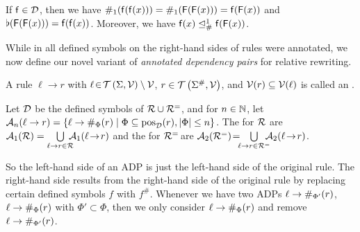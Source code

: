 \begin{example}
    If $\mathsf{f} \in \mathcal{D}$, then we have $\#_{1}(\mathsf{f}(\mathsf{f}(x))) =
    \#_{1}(\mathsf{F}(\mathsf{F}(x))) = \mathsf{f}(\mathsf{F}(x))$ and $\flat(\mathsf{F}(\mathsf{F}(x))) = \mathsf{f}(\mathsf{f}(x))$. 
    Moreover, we have $\mathsf{f}(x) \trianglelefteq_{\#}^{1} \mathsf{f}(\mathsf{F}(x))$.
\end{example}


While in \cite{FLOPS2024} all defined symbols on the right-hand sides of rules were
annotated, 
we now define our novel variant of \emph{annotated dependency pairs}
for relative rewriting.

\begin{definition}\label{def:Canonical-ADPs}
\hspace*{-.2cm}    A rule $\ell\!\to\!r$ with $\ell\!\in\!\TSet{\Sigma}{\VSet} \setminus\linebreak
    \VSet$, $r \in \mathcal{T}\left(\Sigma^\#,\mathcal{V}\right)$, and $\mathcal{V}(r) \subseteq \mathcal{V}(\ell)$ is
    called an
    .
 
    Let $\mathcal{D}$ be the defined symbols of $\mathcal{R} \cup \mathcal{R}^=$, and for $n \in
    \mathbb{N}$, let $\ADPair{n}{\ell \to r}  =  
    \{\ell \to\linebreak \anno_{\Phi}(r) \mid \Phi \subseteq \pos_{\SignatureD}(r), |\Phi| \leq n\}$.
\pagebreak[2]  The   for $\mathcal{R}$ are $\mathcal{A}_{1}(\mathcal{R}) = \bigcup\limits_{\ell \to r \in \mathcal{R}}
  \!\!\!\!  \mathcal{A}_{1}(\ell\!\to\!r)$ and  the  for $\mathcal{R}^=\!$
are  $\ADPairBase{\R^{=}}\!= \!\!\!
    \bigcup\limits_{\ell \to r \in \R^=} \!\!\!\! \ADPairBase{\ell\!\to\!r}$.
\end{definition}

So the left-hand side of an ADP is just the left-hand side of the original rule.
The right-hand side  results from the right-hand side of the original rule
by replacing certain defined symbols $f$ with $f^{\#}$.
Whenever
we have two ADPs  $\ell \to \#_{\Phi'}(r)$,
$\ell \to \#_{\Phi}(r)$
with  $\Phi' \subset \Phi$, then
we only consider $\ell \to \#_{\Phi}(r)$ and remove
 $\ell \to \#_{\Phi'}(r)$.

